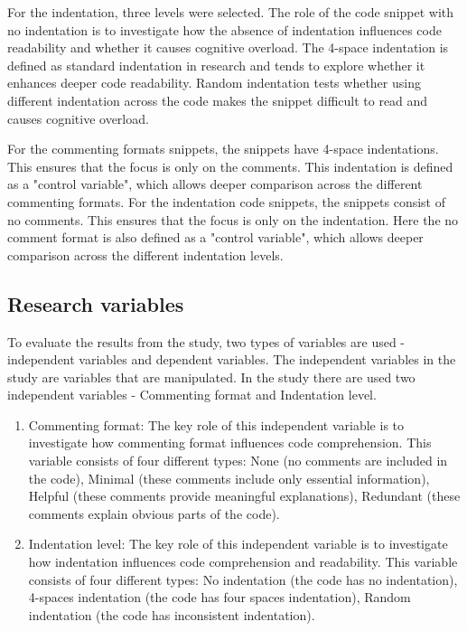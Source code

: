 For the indentation, three levels were selected. 
The role of the code snippet with no indentation is to investigate how the absence of indentation influences code readability and whether it causes cognitive overload.
The 4-space indentation is defined as standard indentation in research and tends to explore whether it enhances deeper code readability.  
Random indentation tests whether using different indentation across the code makes the snippet difficult to read and causes cognitive overload.



For the commenting formats snippets, the snippets have 4-space indentations. This ensures that the focus is only on the comments. This indentation is defined as a "control variable", which allows deeper comparison across the different commenting formats. 
For the indentation code snippets, the snippets consist of no comments. This ensures that the focus is only on the indentation. Here the no comment format is also defined as a "control variable", which allows deeper comparison across the different indentation levels. 

\subsection{Research variables}
To evaluate the results from the study, two types of variables are used - independent variables and dependent variables. The independent variables in the study are variables that are manipulated. In the study there are used two independent variables - Commenting format and Indentation level.

\begin{enumerate}
     \item Commenting format: The key role of this independent variable is to investigate how commenting format influences code comprehension. This variable consists of four different types: None (no comments are included in the code), Minimal (these comments include only essential information), Helpful (these comments provide meaningful explanations), Redundant (these comments explain obvious parts of the code). 

    \item Indentation level: The key role of this independent variable is to investigate how indentation influences code comprehension and readability. This variable consists of four different types: No indentation (the code has no indentation), 4-spaces indentation (the code has four spaces indentation), Random indentation (the code has inconsistent indentation). 
\end{enumerate}


